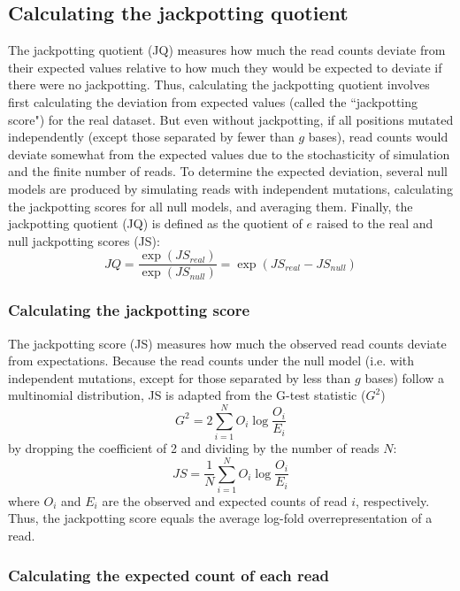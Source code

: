 \documentclass[11pt]{article}
\begin{document}
\subsection{Calculating the jackpotting quotient}
\label{calc-jackpotting-quotient}

The jackpotting quotient (JQ) measures how much the read counts deviate from their expected values relative to how much they would be expected to deviate if there were no jackpotting.
Thus, calculating the jackpotting quotient involves first calculating the deviation from expected values (called the ``jackpotting score") for the real dataset.
But even without jackpotting, if all positions mutated independently (except those separated by fewer than $g$ bases), read counts would deviate somewhat from the expected values due to the stochasticity of simulation and the finite number of reads.
To determine the expected deviation, several null models are produced by simulating reads with independent mutations, calculating the jackpotting scores for all null models, and averaging them.
Finally, the jackpotting quotient (JQ) is defined as the quotient of $e$ raised to the real and null jackpotting scores (JS):
$$JQ = \frac{\exp{({JS}_{real})}}{\exp{({JS}_{null})}} = \exp{({JS}_{real} - {JS}_{null})}$$

\subsubsection{Calculating the jackpotting score}
\label{calc-jackpotting-score}

The jackpotting score (JS) measures how much the observed read counts deviate from expectations.
Because the read counts under the null model (i.e. with independent mutations, except for those separated by less than $g$ bases) follow a multinomial distribution, JS is adapted from the G-test statistic ($G^2$)~\cite{Read1988}
$$G^2 = 2\sum_{i=1}^N{O_i\log{\frac{O_i}{E_i}}}$$
by dropping the coefficient of 2 and dividing by the number of reads $N$:
$$JS = \frac{1}{N}\sum_{i=1}^N{O_i\log{\frac{O_i}{E_i}}}$$
where $O_i$ and $E_i$ are the observed and expected counts of read $i$, respectively.
Thus, the jackpotting score equals the average log-fold overrepresentation of a read.

\subsubsection{Calculating the expected count of each read}
\label{calc-expected-count}
\end{document}
